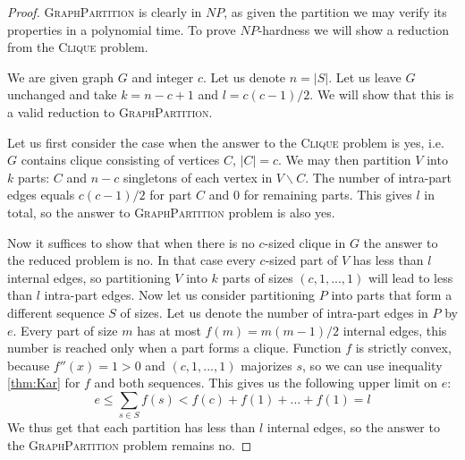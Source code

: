 \begin{proof}
\textsc{GraphPartition} is clearly in $NP$,
as given the partition we may verify its properties in a polynomial time.
To prove $NP$-hardness we will show a reduction from the \textsc{Clique} problem.

We are given graph $G$ and integer $c$.
Let us denote $n = \left\vert{S}\right\vert $.
Let us leave $G$ unchanged and take $k = n-c+1$ and $l = c(c-1)/2$.
We will show that this is a valid reduction to \textsc{GraphPartition}.

Let us first consider the case when the answer to the \textsc{Clique} problem is yes,
i.e. $G$ contains clique consisting of vertices $C$, $\left\vert{C}\right\vert = c$.
We may then partition $V$ into $k$ parts: $C$ and $n-c$ singletons of each vertex in $V \backslash C$.
The number of intra-part edges equals $c(c-1)/2$ for part $C$ and $0$ for remaining parts.
This gives $l$ in total, so the answer to \textsc{GraphPartition} problem is also yes.

Now it suffices to show that when there is no $c$-sized clique in $G$
the answer to the reduced problem is no.
In that case every $c$-sized part of $V$ has less than $l$ internal edges,
so partitioning $V$ into $k$ parts of sizes $(c, 1, ..., 1)$ will lead to less than $l$ intra-part edges.
Now let us consider partitioning $P$ into parts that form a different sequence $S$ of sizes.
Let us denote the number of intra-part edges in $P$ by $e$.
Every part of size $m$ has at most $f(m) = m(m-1)/2$ internal edges,
this number is reached only when a part forms a clique.
Function $f$ is strictly convex, because $f''(x) = 1 > 0$ and $(c,1,...,1)$ majorizes $s$,
so we can use inequality \ref{thm:Kar} for $f$ and both sequences.
This gives us the following upper limit on $e$:
$$e \leq \sum_{s\in{S}} f(s) < f(c) + f(1) + ... + f(1) = l$$
We thus get that each partition has less than $l$ internal edges,
so the answer to the \textsc{GraphPartition} problem remains no.
\end{proof}

